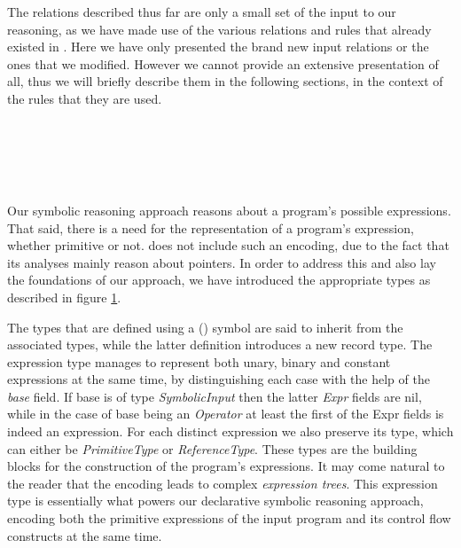 The relations described thus far are only a small set of the input to our reasoning, as we have
made use of the various relations and rules that already existed in \doop{}. Here we have
only presented the brand new input relations or the ones that we modified. However we cannot
provide an extensive presentation of all, thus we will briefly describe them in the
following sections, in the context of the rules that they are used.

\begin{figure}[th]
  \\
  \\
  \\
  \\
  \label{fig:expr-type}
\end{figure}

Our symbolic reasoning approach reasons about a program's possible expressions. That
said, there is a need for the representation of a program's expression, whether primitive
or not. \doop{} does not include such an encoding, due to the fact that its analyses mainly
reason about pointers. In order to address this and also lay the foundations of our approach,
we have introduced the appropriate types as described in figure \ref{fig:expr-type}.

The types that are defined using a (\dl{|}) symbol are said to inherit from the
associated types, while the latter definition introduces a new record type. The
expression type manages to represent both unary, binary and constant expressions at the same time,
by distinguishing each case with the help of the \emph{base} field. If base is of type
\emph{SymbolicInput} then the latter \emph{Expr} fields are nil, while in the case of
base being an \emph{Operator} at least the first of the Expr fields is indeed an expression.
For each distinct expression we also preserve its type, which can either be
\emph{PrimitiveType} or \emph{ReferenceType}. These types are the building blocks for the
construction of the program's expressions. It may come natural to the reader that
the encoding leads to complex \emph{expression trees}. This expression type is essentially
what powers our declarative symbolic reasoning approach, encoding both the primitive
expressions of the input program and its control flow constructs at the same time.

